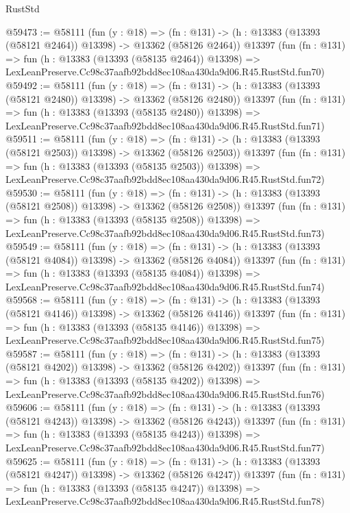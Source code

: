 \begin{lexlean}{RustStd}
\begin{coremodule}
@59473 := @58111
    (fun (y : @18) =>
    (fn : @131) -> (h : @13383 (@13393 (@58121 @2464)) @13398) -> @13362 (@58126 @2464))
    @13397
    (fun (fn : @131) =>
    fun (h : @13383 (@13393 (@58135 @2464)) @13398) =>
    LexLeanPreserve.Cc98c37aafb92bdd8ec108aa430da9d06.R45.RustStd.fun70)
@59492 := @58111
    (fun (y : @18) =>
    (fn : @131) -> (h : @13383 (@13393 (@58121 @2480)) @13398) -> @13362 (@58126 @2480))
    @13397
    (fun (fn : @131) =>
    fun (h : @13383 (@13393 (@58135 @2480)) @13398) =>
    LexLeanPreserve.Cc98c37aafb92bdd8ec108aa430da9d06.R45.RustStd.fun71)
@59511 := @58111
    (fun (y : @18) =>
    (fn : @131) -> (h : @13383 (@13393 (@58121 @2503)) @13398) -> @13362 (@58126 @2503))
    @13397
    (fun (fn : @131) =>
    fun (h : @13383 (@13393 (@58135 @2503)) @13398) =>
    LexLeanPreserve.Cc98c37aafb92bdd8ec108aa430da9d06.R45.RustStd.fun72)
@59530 := @58111
    (fun (y : @18) =>
    (fn : @131) -> (h : @13383 (@13393 (@58121 @2508)) @13398) -> @13362 (@58126 @2508))
    @13397
    (fun (fn : @131) =>
    fun (h : @13383 (@13393 (@58135 @2508)) @13398) =>
    LexLeanPreserve.Cc98c37aafb92bdd8ec108aa430da9d06.R45.RustStd.fun73)
@59549 := @58111
    (fun (y : @18) =>
    (fn : @131) -> (h : @13383 (@13393 (@58121 @4084)) @13398) -> @13362 (@58126 @4084))
    @13397
    (fun (fn : @131) =>
    fun (h : @13383 (@13393 (@58135 @4084)) @13398) =>
    LexLeanPreserve.Cc98c37aafb92bdd8ec108aa430da9d06.R45.RustStd.fun74)
@59568 := @58111
    (fun (y : @18) =>
    (fn : @131) -> (h : @13383 (@13393 (@58121 @4146)) @13398) -> @13362 (@58126 @4146))
    @13397
    (fun (fn : @131) =>
    fun (h : @13383 (@13393 (@58135 @4146)) @13398) =>
    LexLeanPreserve.Cc98c37aafb92bdd8ec108aa430da9d06.R45.RustStd.fun75)
@59587 := @58111
    (fun (y : @18) =>
    (fn : @131) -> (h : @13383 (@13393 (@58121 @4202)) @13398) -> @13362 (@58126 @4202))
    @13397
    (fun (fn : @131) =>
    fun (h : @13383 (@13393 (@58135 @4202)) @13398) =>
    LexLeanPreserve.Cc98c37aafb92bdd8ec108aa430da9d06.R45.RustStd.fun76)
@59606 := @58111
    (fun (y : @18) =>
    (fn : @131) -> (h : @13383 (@13393 (@58121 @4243)) @13398) -> @13362 (@58126 @4243))
    @13397
    (fun (fn : @131) =>
    fun (h : @13383 (@13393 (@58135 @4243)) @13398) =>
    LexLeanPreserve.Cc98c37aafb92bdd8ec108aa430da9d06.R45.RustStd.fun77)
@59625 := @58111
    (fun (y : @18) =>
    (fn : @131) -> (h : @13383 (@13393 (@58121 @4247)) @13398) -> @13362 (@58126 @4247))
    @13397
    (fun (fn : @131) =>
    fun (h : @13383 (@13393 (@58135 @4247)) @13398) =>
    LexLeanPreserve.Cc98c37aafb92bdd8ec108aa430da9d06.R45.RustStd.fun78)

\end{coremodule}
\end{lexlean}
